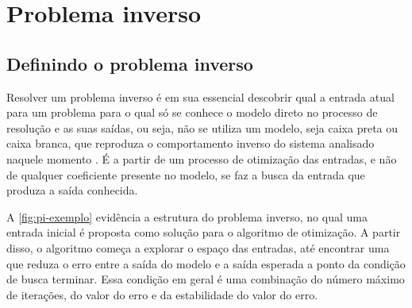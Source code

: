 \chapter{Problema inverso} \label{cha:pi}

\section{Definindo o problema inverso} \label{sec:pi-def}
Resolver um problema inverso é em sua essencial descobrir qual a entrada atual para um problema para o qual só se conhece o modelo direto no processo de resolução e as suas saídas, ou seja, não se utiliza um modelo, seja caixa preta ou caixa branca, que reproduza o comportamento inverso do sistema analisado naquele momento \cite{ljung1999system}. É a partir de um processo de otimização das entradas, e não de qualquer coeficiente presente no modelo, se faz a busca da entrada que produza a saída conhecida.

A \autoref{fig:pi-exemplo} evidência a estrutura do problema inverso, no qual uma entrada inicial é proposta como solução para o algoritmo de otimização. A partir disso, o algoritmo começa a explorar o espaço das entradas, até encontrar uma que reduza o erro entre a saída do modelo e a saída esperada a ponto da condição de busca terminar. Essa condição em geral é uma combinação do número máximo de iterações, do valor do erro e da estabilidade do valor do erro.


